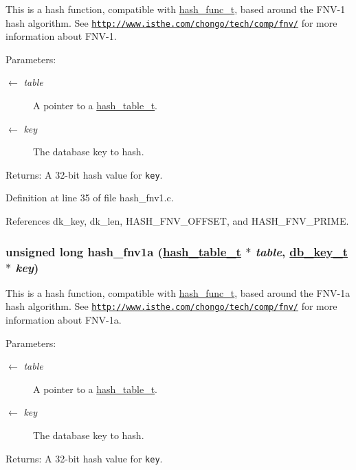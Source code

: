 This is a hash function, compatible with \hyperlink{group__dbprim__hash_ga4}{hash\_\-func\_\-t}, based around the FNV-1 hash algorithm. See \href{http://www.isthe.com/chongo/tech/comp/fnv/}{\tt http://www.isthe.com/chongo/tech/comp/fnv/} for more information about FNV-1.

\begin{Desc}
\item[Parameters:]
\begin{description}
\item[\mbox{$\leftarrow$} {\em table}]A pointer to a \hyperlink{group__dbprim__hash_ga1}{hash\_\-table\_\-t}. \item[\mbox{$\leftarrow$} {\em key}]The database key to hash.\end{description}
\end{Desc}
\begin{Desc}
\item[Returns:]A 32-bit hash value for {\tt key}.\end{Desc}


Definition at line 35 of file hash\_\-fnv1.c.

References dk\_\-key, dk\_\-len, HASH\_\-FNV\_\-OFFSET, and HASH\_\-FNV\_\-PRIME.\hypertarget{group__dbprim__hash_ga8}{
\subsubsection[hash\_\-fnv1a]{\setlength{\rightskip}{0pt plus 5cm}unsigned long hash\_\-fnv1a (\hyperlink{struct__hash__table__s}{hash\_\-table\_\-t} $\ast$ {\em table}, \hyperlink{struct__db__key__s}{db\_\-key\_\-t} $\ast$ {\em key})}}
\label{group__dbprim__hash_ga8}


This is a hash function, compatible with \hyperlink{group__dbprim__hash_ga4}{hash\_\-func\_\-t}, based around the FNV-1a hash algorithm. See \href{http://www.isthe.com/chongo/tech/comp/fnv/}{\tt http://www.isthe.com/chongo/tech/comp/fnv/} for more information about FNV-1a.

\begin{Desc}
\item[Parameters:]
\begin{description}
\item[\mbox{$\leftarrow$} {\em table}]A pointer to a \hyperlink{group__dbprim__hash_ga1}{hash\_\-table\_\-t}. \item[\mbox{$\leftarrow$} {\em key}]The database key to hash.\end{description}
\end{Desc}
\begin{Desc}
\item[Returns:]A 32-bit hash value for {\tt key}.\end{Desc}


